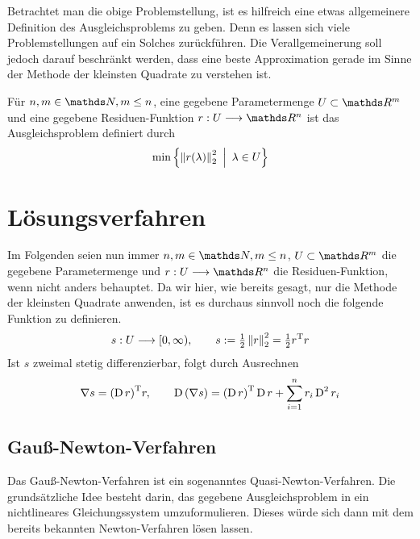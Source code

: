 			Betrachtet man die obige Problemstellung, ist es hilfreich eine etwas allgemeinere Definition des Ausgleichsproblems zu geben.
			Denn es lassen sich viele Problemstellungen auf ein Solches zurückführen.
			Die Verallgemeinerung soll jedoch darauf beschränkt werden, dass eine beste Approximation gerade im Sinne der Methode der kleinsten Quadrate zu verstehen ist.
			\bigskip

			\begin{definition*}
				Für $n,m\in\SN, m\leq n$, eine gegebene Parametermenge $U\subset\SR^m$ und eine gegebene Residuen-Funktion $r:U\longrightarrow\SR^n$ ist das Ausgleichsproblem definiert durch
				\[ \min \left\{ \left\| r(\lambda) \right\|^2_2 \enspace \middle\vert \enspace \lambda\in U \right\} \]
			\end{definition*}



	\section{Lösungsverfahren} %
	\label{sec:l_sungsverfahren}
	
		Im Folgenden seien nun immer $n,m\in\SN, m\leq n$, $U\subset\SR^m$ die gegebene Parametermenge und $r:U\longrightarrow\SR^n$ die Residuen-Funktion, wenn nicht anders behauptet.
		Da wir hier, wie bereits gesagt, nur die Methode der kleinsten Quadrate anwenden, ist es durchaus sinnvoll noch die folgende Funktion zu definieren.
		\[ s:U\longrightarrow[0,\infty),\qquad s := \tfrac{1}{2}\left\| r \right\|_2^2 = \tfrac{1}{2}{r}^{\mathrm{T}}r \]
		Ist $s$ zweimal stetig differenzierbar, folgt durch Ausrechnen
		\begin{alignat*}{3}
			\nabla s = {\left( \operatorname{\mathrm{D}} r \right)}^{\mathrm{T}}r,\qquad \operatorname{\mathrm{D}}\left( \nabla s \right) = {\left( \operatorname{\mathrm{D}} r \right)}^{\mathrm{T}}\operatorname{\mathrm{D}} r + \sum_{i=1}^n r_i \operatorname{\mathrm{D}}^2r_i
		\end{alignat*}

		\subsection{Gauß-Newton-Verfahren} %
		\label{sub:gau_newton_verfahren}
		
			Das Gauß-Newton-Verfahren ist ein sogenanntes Quasi-Newton-Verfahren.
			Die grundsätzliche Idee besteht darin, das gegebene Ausgleichsproblem in ein nichtlineares Gleichungssystem umzuformulieren.
			Dieses würde sich dann mit dem bereits bekannten Newton-Verfahren lösen lassen.\\

